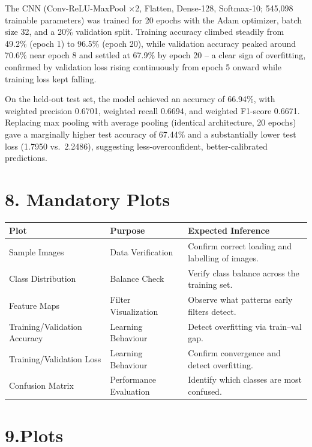 \documentclass[11pt]{article}
\begin{document}
The CNN (Conv-ReLU-MaxPool $\times$2, Flatten, Dense-128, Softmax-10; 545{,}098 trainable parameters) was trained for 20 epochs with the Adam optimizer, batch size 32, and a 20\% validation split. Training accuracy climbed steadily from 49.2\% (epoch 1) to 96.5\% (epoch 20), while validation accuracy peaked around 70.6\% near epoch 8 and settled at 67.9\% by epoch 20 -- a clear sign of overfitting, confirmed by validation loss rising continuously from epoch 5 onward while training loss kept falling.

On the held-out test set, the model achieved an accuracy of 66.94\%, with weighted precision 0.6701, weighted recall 0.6694, and weighted F1-score 0.6671. Replacing max pooling with average pooling (identical architecture, 20 epochs) gave a marginally higher test accuracy of 67.44\% and a substantially lower test loss (1.7950 vs.\ 2.2486), suggesting less-overconfident, better-calibrated predictions.

\section*{8. Mandatory Plots}

\begin{longtable}{|p{3.4cm}|p{3.4cm}|p{6cm}|}
\hline
\textbf{Plot} & \textbf{Purpose} & \textbf{Expected Inference}\\
\hline
Sample Images & Data Verification & Confirm correct loading and labelling of images.\\
\hline
Class Distribution & Balance Check & Verify class balance across the training set.\\
\hline
Feature Maps & Filter Visualization & Observe what patterns early filters detect.\\
\hline
Training/Validation Accuracy & Learning Behaviour & Detect overfitting via train--val gap.\\
\hline
Training/Validation Loss & Learning Behaviour & Confirm convergence and detect overfitting.\\
\hline
Confusion Matrix & Performance Evaluation & Identify which classes are most confused.\\
\hline
\end{longtable}

\section*{9.Plots}
\end{document}
